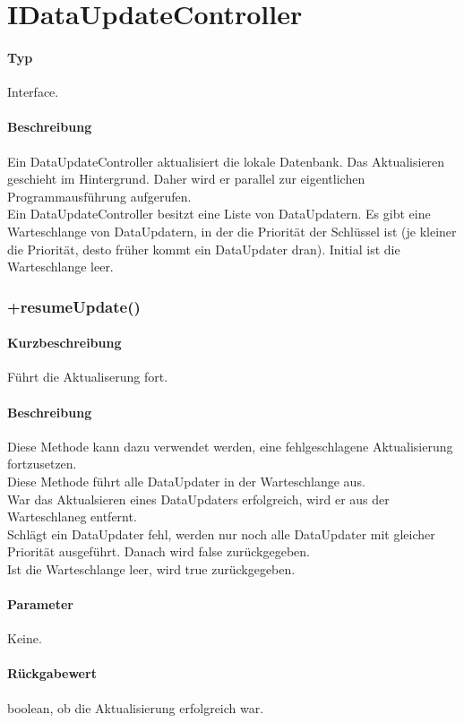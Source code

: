 \section{IDataUpdateController}
\paragraph*{Typ}
Interface.
\paragraph*{Beschreibung}
Ein DataUpdateController aktualisiert die lokale Datenbank. Das Aktualisieren geschieht im 
Hintergrund. Daher wird er parallel zur eigentlichen Programmausführung aufgerufen.\\
Ein DataUpdateController besitzt eine Liste von DataUpdatern.
Es gibt eine Warteschlange von DataUpdatern, in der die Priorität der Schlüssel ist (je kleiner 
die Priorität, desto früher kommt ein DataUpdater dran). Initial ist die Warteschlange leer.\\


\subsubsection{+resumeUpdate()}%
\paragraph*{Kurzbeschreibung}
Führt die Aktualiserung fort.
\paragraph*{Beschreibung}
Diese Methode kann dazu verwendet werden, eine fehlgeschlagene Aktualisierung fortzusetzen.\\
Diese Methode führt alle DataUpdater in der Warteschlange aus.\\
War das Aktualsieren eines DataUpdaters erfolgreich, wird er aus der Warteschlaneg entfernt.\\
Schlägt ein DataUpdater fehl, werden nur noch alle DataUpdater mit gleicher Priorität 
ausgeführt. Danach wird false zurückgegeben.\\
Ist die Warteschlange leer, wird true zurückgegeben.\\
\paragraph*{Parameter}
Keine.
\paragraph*{Rückgabewert}
boolean, ob die Aktualisierung erfolgreich war.

